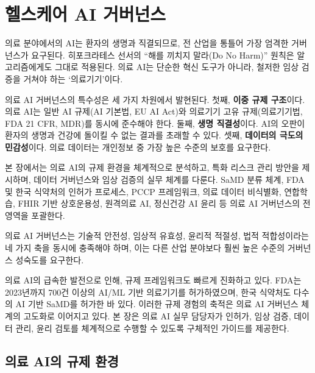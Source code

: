 
\chapter{헬스케어 AI 거버넌스}
\label{ch:healthcare_governance}

의료 분야에서의 AI는 환자의 생명과 직결\cite{gerke2020ethical}되므로, 전 산업을 통틀어 가장 엄격한 거버넌스가 요구된다. 히포크라테스 선서의 ``해를 끼치지 말라(Do No Harm)'' 원칙은 알고리즘에게도 그대로 적용된다\cite{topol2019high}. 의료 AI는 단순한 혁신 도구가 아니라, 철저한 임상 검증을 거쳐야 하는 `의료기기'이다.

의료 AI 거버넌스의 특수성은 세 가지 차원에서 발현된다. 첫째, \textbf{이중 규제 구조}이다. 의료 AI는 일반 AI 규제(AI 기본법, EU AI Act)와 의료기기 고유 규제(의료기기법, FDA 21 CFR, MDR)를 동시에 준수해야 한다. 둘째, \textbf{생명 직결성}이다. AI의 오판이 환자의 생명과 건강에 돌이킬 수 없는 결과를 초래할 수 있다. 셋째, \textbf{데이터의 극도의 민감성}이다. 의료 데이터는 개인정보 중 가장 높은 수준\cite{chen2021synthetic}의 보호를 요구한다.

본 장에서는 의료 AI의 규제 환경을 체계적으로 분석하고, 특화 리스크 관리 방안을 제시하며, 데이터 거버넌스와 임상 검증의 실무 체계를 다룬다. SaMD\cite{fda2021ai} 분류 체계, FDA 및 한국 식약처의 인허가 프로세스, PCCP 프레임워크, 의료 데이터 비식별화\cite{dwork2014algorithmic}, 연합학습\cite{mcmahan2017communication}, FHIR\cite{char2018implementing} 기반 상호운용성, 원격의료\cite{davenport2019potential} AI, 정신건강 AI 윤리 등 의료 AI 거버넌스의 전 영역을 포괄한다.

의료 AI 거버넌스는 기술적 안전성, 임상적 유효성, 윤리적 적절성, 법적 적합성이라는 네 가지 축을 동시에 충족해야 하며, 이는 다른 산업 분야보다 훨씬 높은 수준의 거버넌스 성숙도를 요구한다.

의료 AI의 급속한 발전으로 인해, 규제 프레임워크도 빠르게 진화하고 있다.
FDA는 2023년까지 700건 이상의 AI/ML 기반 의료기기를 허가하였으며,
한국 식약처도 다수의 AI 기반 SaMD를 허가한 바 있다.
이러한 규제 경험의 축적은 의료 AI 거버넌스 체계의 고도화로 이어지고 있다.
본 장은 의료 AI 실무 담당자가 인허가, 임상 검증, 데이터 관리, 윤리 검토를 체계적으로 수행할 수 있도록 구체적인 가이드를 제공한다.

\section{의료 AI의 규제 환경}
\label{sec:16.1}

